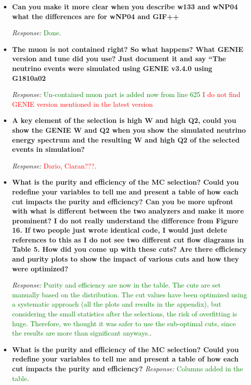 \documentclass[11pt]{article}
\begin{document}
\begin{itemize}[leftmargin=*]
\textit{Response:} \textcolor{red}{is it checked? needs to be consistent within Figure, caption and within the plot, replace all week by POT.}.



\item \textbf{Can you make it more clear when you describe w133 and wNP04 what the differences are for
wNP04 and GIF++}

\textit{Response:} \textcolor{green}{Done}.




\item \textbf{The muon is not contained right? So what happens?
What GENIE version and tune did you use? Just document it and say “The neutrino events
were simulated using GENIE v3.4.0 using G1810a02}


\textit{Response:} \textcolor{green}{Un-contained muon part is added now from line 625} \textcolor{red}{I do not find GENIE version mentioned in the latest version}

\item \textbf{A key element of the selection is high W and high Q2, could you show the GENIE W and Q2
when you show the simulated neutrino energy spectrum and the resulting W and high Q2 of the
selected events in simulation?}

\textit{Response:} \textcolor{red}{Dario, Ciaran???}.

\item \textbf{What is the purity and efficiency of the MC selection? Could you redefine your variables to tell me and present a table of how each cut impacts the purity and efficiency?
Can you be more upfront with what is different between the two analyzers and make it more
prominent? I do not really understand the difference from Figure 16. If two people just wrote
identical code, I would just delete references to this as I do not see two different cut flow
diagrams in Table 5.
How did you come up with these cuts? Are there efficiency and purity plots to show the impact
of various cuts and how they were optimized?}

\textit{Response:} \textcolor{green}{Purity and efficiency are now in the table. The cuts are set manually based on the distribution. The cut values have been optimized using a systematic approach (all the plots and results in the appendix), but considering the small statistics after the selections, the risk of overfitting is huge. Therefore, we thought it was safer to use the sub-optimal cuts, since the results are more than significant anyways.}.

\item \textbf{What is the purity and efficiency of the MC selection? Could you redefine your variables to tell me and present a table of how each cut impacts the purity and efficiency?}
\textit{Response:} \textcolor{green}{Columns added in the table}.

\end{itemize}
\end{document}
